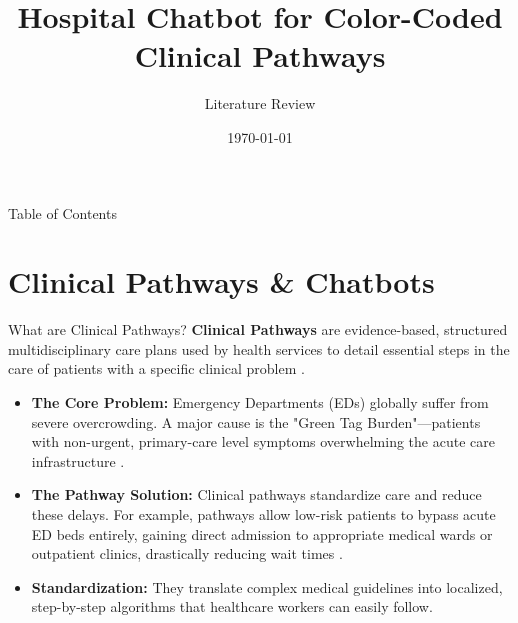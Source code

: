 \documentclass[aspectratio=169]{beamer}
\title{Hospital Chatbot for Color-Coded Clinical Pathways}
\subtitle{Literature Review}
\author{}
\date{\today}
\begin{document}
	
	\begin{frame}
		\titlepage
	\end{frame}
	
	\begin{frame}{Table of Contents}
		\tableofcontents
	\end{frame}
	
	\section{Clinical Pathways \& Chatbots}
	
	\begin{frame}{What are Clinical Pathways?}
		\textbf{Clinical Pathways} are evidence-based, structured multidisciplinary care plans used by health services to detail essential steps in the care of patients with a specific clinical problem \cite{Sundstrom2014}.
		\vspace{0.2cm}
		\begin{itemize}
			\item \textbf{The Core Problem:} Emergency Departments (EDs) globally suffer from severe overcrowding. A major cause is the "Green Tag Burden"—patients with non-urgent, primary-care level symptoms overwhelming the acute care infrastructure \cite{Yilmaz2021}.
			\item \textbf{The Pathway Solution:} Clinical pathways standardize care and reduce these delays. For example, pathways allow low-risk patients to bypass acute ED beds entirely, gaining direct admission to appropriate medical wards or outpatient clinics, drastically reducing wait times \cite{Sundstrom2014}.
			\item \textbf{Standardization:} They translate complex medical guidelines into localized, step-by-step algorithms that healthcare workers can easily follow.
		\end{itemize}
	\end{frame}
	
\end{document}
